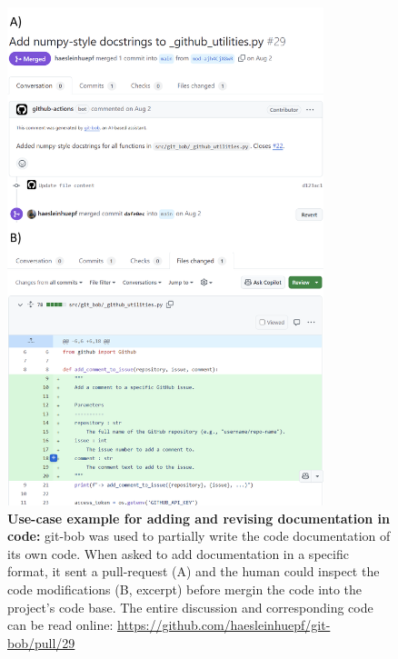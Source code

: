 \documentclass[sn-mathphys-num]{sn-jnl}%
\theoremstyle{thmstyleone}%
\theoremstyle{thmstyletwo}%
\theoremstyle{thmstylethree}%
\begin{document}
\begin{appendices}
\begin{figure}[h]
\centering
\includegraphics[width=0.82\textwidth]{example_add_documentation.png}
\caption{\textbf{Use-case example for adding and revising documentation in code:} git-bob was used to partially write the code documentation of its own code. When asked to add documentation in a specific format, it sent a pull-request (A) and the human could inspect the code modifications (B, excerpt) before mergin the code into the project's code base. The entire discussion and corresponding code can be read online: \url{https://github.com/haesleinhuepf/git-bob/pull/29}
\newline
\newline
}
\label{fig:example_add_documentation}
\end{figure}



\end{appendices}
\end{document}
